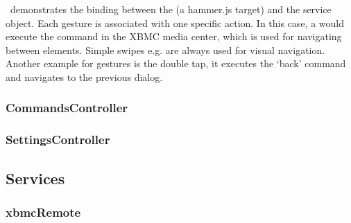  \ demonstrates the binding between the  (a hammer.js target) and the  service object. Each gesture is associated with one specific action. In this case, a  would execute the  command in the XBMC media center, which is used for navigating between elements. Simple swipes e.g. are always used for visual navigation. Another example for gestures is the double tap, it executes the `back' command and navigates to the previous dialog.

\subsubsection{CommandsController}

\subsubsection{SettingsController}

\subsection{Services}

\subsubsection{xbmcRemote}
\label{subsubsec:xbmcRemote}